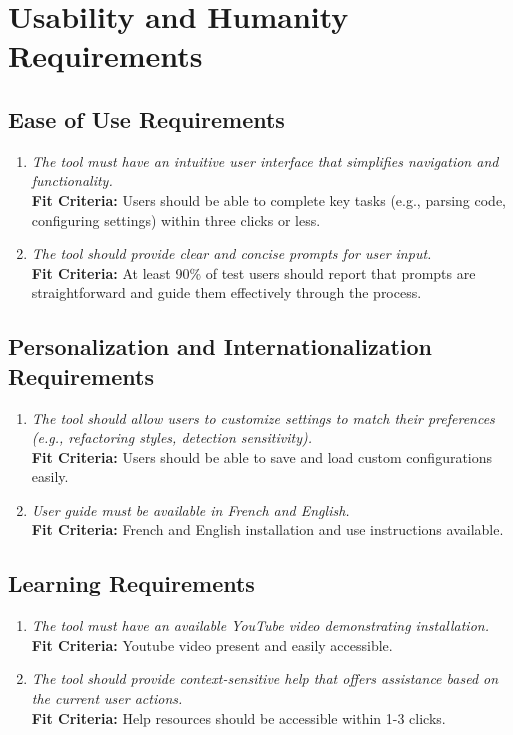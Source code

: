 \documentclass[12pt]{article}
\begin{document}
\section{Usability and Humanity Requirements}
\subsection{Ease of Use Requirements}
\begin{enumerate}[label=LF-EOU \arabic*., wide=0pt, leftmargin=*]
  \item \emph{The tool must have an intuitive user interface that simplifies navigation and functionality.}\\
  {\bf Fit Criteria:} Users should be able to complete key tasks (e.g., parsing code, configuring settings) within three clicks or less.
  
  \item \emph{The tool should provide clear and concise prompts for user input.}\\
  {\bf Fit Criteria:} At least 90\% of test users should report that prompts are straightforward and guide them effectively through the process.
\end{enumerate}

\subsection{Personalization and Internationalization Requirements}
\begin{enumerate}[label=LF-PSI \arabic*., wide=0pt, leftmargin=*]
  \item \emph{The tool should allow users to customize settings to match their preferences (e.g., refactoring styles, detection sensitivity).}\\
  {\bf Fit Criteria:} Users should be able to save and load custom configurations easily.
  
  \item \emph{User guide must be available in French and English.}\\
  {\bf Fit Criteria:} French and English installation and use instructions available.
\end{enumerate}

\subsection{Learning Requirements}
\begin{enumerate}[label=LF-LRN \arabic*., wide=0pt, leftmargin=*]
  \item \emph{The tool must have an available YouTube video demonstrating installation.}\\
  {\bf Fit Criteria:} Youtube video present and easily accessible.
  
  \item \emph{The tool should provide context-sensitive help that offers assistance based on the current user actions.}\\
  {\bf Fit Criteria:} Help resources should be accessible within 1-3 clicks.
\end{enumerate}
\end{document}
